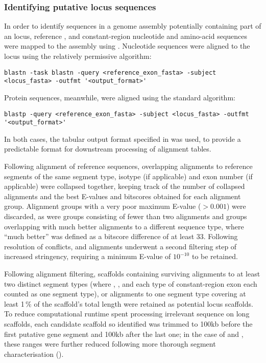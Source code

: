 \subsubsection{Identifying putative locus sequences}
\label{sec:methods_comp_locus_scaffolds}

In order to identify sequences in a genome assembly potentially containing part of an \igh{} locus, reference \vh, \jh and constant-region nucleotide and amino-acid sequences were mapped to the assembly using  \parencite{altschul1990blast,altschul1997blast}. Nucleotide sequences were aligned to the locus using the relatively permissive  algorithm:

\begin{lstlisting}
blastn -task blastn -query <reference_exon_fasta> -subject <locus_fasta> -outfmt '<output_format>'
\end{lstlisting}

\noindent Protein sequences, meanwhile, were aligned using the standard  algorithm:

\begin{lstlisting}
blastp -query <reference_exon_fasta> -subject <locus_fasta> -outfmt '<output_format>'
\end{lstlisting}

\noindent In both cases, the tabular output format specified in  was used, to provide a predictable format for downstream processing of  alignment tables.

Following alignment of reference sequences, overlapping alignments to reference segments of the same segment type, isotype (if applicable) and exon number (if applicable) were collapsed together, keeping track of the number of collapsed alignments and the best E-values and bitscores obtained for each alignment group. Alignment groups with a very poor maximum E-value ($> 0.001$) were discarded, as were groups consisting of fewer than two alignments and groups overlapping with much better alignments to a different sequence type, where ``much better'' was defined as a bitscore difference of at least 33. Following resolution of conflicts, \vh and \ch alignments underwent a second filtering step of increased stringency, requiring a minimum E-value of $10^{-10}$ to be retained. 

Following alignment filtering, scaffolds containing surviving alignments to at least two distinct segment types (where \vh, \jh, and each type of constant-region exon each counted as one segment type), or alignments to one segment type covering at least 1\,\% of the scaffold's total length were retained as potential locus scaffolds. To reduce computational runtime spent processing irrelevant sequence on long scaffolds, each candidate scaffold so identified was trimmed to 100kb before the first putative gene segment and 100kb after the last one; in the case of \nfu and \xma, these ranges were further reduced following more thorough segment characterisation ().

